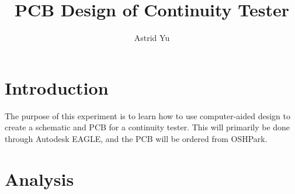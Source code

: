 \documentclass[12pt]{article}
\author{Astrid Yu}
\title{PCB Design of Continuity Tester}
\begin{document}
\maketitle

\section{Introduction}

The purpose of this experiment is to learn how to use computer-aided design to 
create a schematic and PCB for a continuity tester. This will primarily be done 
through Autodesk EAGLE, and the PCB will be ordered from OSHPark.

\section{Analysis}
\end{document}

